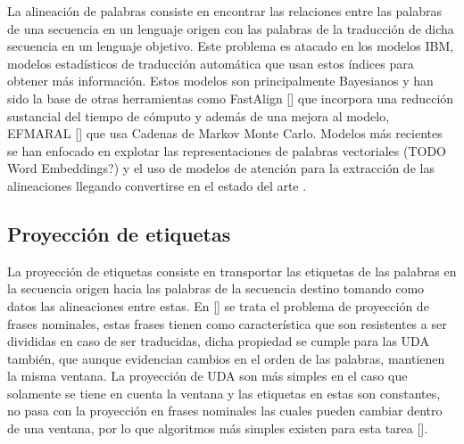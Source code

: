 La alineación de palabras consiste en encontrar las relaciones entre las palabras de una secuencia
en un lenguaje origen con las palabras de la traducción de dicha secuencia en un lenguaje objetivo.
Este problema es atacado en los modelos IBM, modelos estadísticos de traducción automática que usan estos 
índices para obtener más información. Estos modelos son principalmente Bayesianos y han sido la base de
otras herramientas como FastAlign [\cite{dyer2013fastalign}] que incorpora una reducción sustancial del
tiempo de cómputo y además de una mejora al modelo, EFMARAL [\cite{ostling2016efficient}] que usa
Cadenas de Markov Monte Carlo. Modelos más recientes se han enfocado en explotar las representaciones
de palabras vectoriales (TODO Word Embeddings?) y el uso de modelos de atención para la extracción de las
alineaciones llegando convertirse en el estado del arte \cite{dou2021word}.

\subsection{Proyección de etiquetas}

La proyección de etiquetas consiste en transportar las etiquetas de las palabras en la secuencia origen
hacia las palabras de la secuencia destino tomando como datos las alineaciones entre estas. En [\cite{yarowsky2001inducing}]
se trata el problema de proyección de frases nominales, estas frases tienen como característica que son resistentes
a ser divididas en caso de ser traducidas, dicha propiedad se cumple para las UDA también, que aunque evidencian 
cambios en el orden de las palabras, mantienen la misma ventana. La proyección de UDA son más simples en el caso
que solamente se tiene en cuenta la ventana y las etiquetas en estas son constantes, no pasa con la proyección en
frases nominales las cuales pueden cambiar dentro de una ventana, por lo que algoritmos más simples existen
para esta tarea [\cite{eger2018cross}].  







